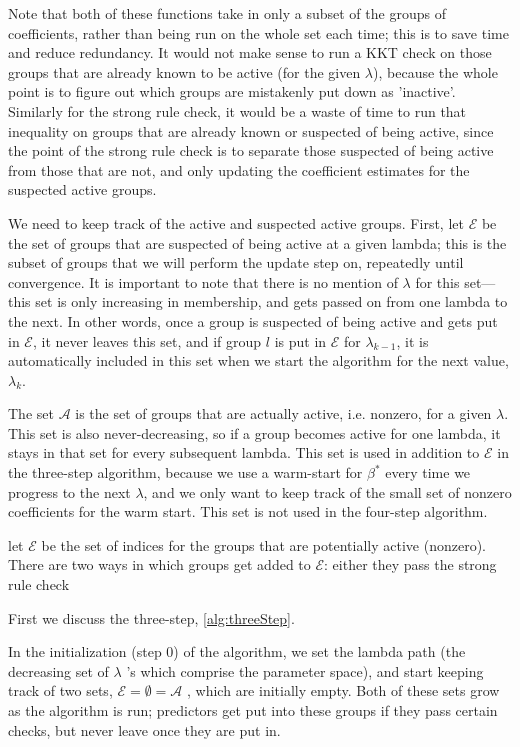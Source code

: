 \documentclass[titlepage]{article}
\begin{document}
Note that both of these functions take in only a subset of the groups of coefficients, rather than being run on the whole set each time; this is to save time and reduce redundancy. It would not make sense to run a KKT check on those groups that are already known to be active (for the given $\lambda$), because the whole point is to figure out which groups are mistakenly put down as 'inactive'. Similarly for the strong rule check, it would be a waste of time to run that inequality on groups that are already known or suspected of being active, since the point of the strong rule check is to separate those suspected of being active from those that are not, and only updating the coefficient estimates for the suspected active groups.

We need to keep track of the active and suspected active groups. First, let $\mathcal{E}$ be the set of groups that are suspected of being active at a given lambda; this is the subset of groups that we will perform the update step on, repeatedly until convergence. It is important to note that there is no mention of $\lambda$ for this set---this set is only increasing in membership, and gets passed on from one lambda to the next. In other words, once a group is suspected of being active and gets put in $\mathcal{E}$, it never leaves this set, and if group $l$ is put in $\mathcal{E}$ for $\lambda_{k-1}$, it is automatically included in this set when we start the algorithm for the next value, $\lambda_k$. 

The set $\mathcal{A}$ is the set of groups that are actually active, i.e. nonzero, for a given $\lambda$. This set is also never-decreasing, so if a group becomes active for one lambda, it stays in that set for every subsequent lambda. This set is used in addition to $\mathcal{E}$ in the three-step algorithm, because we use a warm-start for $\beta^*$ every time we progress to the next $\lambda$, and we only want to keep track of the small set of nonzero coefficients for the warm start. This set is not used in the four-step algorithm.

let $\mathcal{E}$ be the set of indices for the groups that are potentially active (nonzero). There are two ways in which groups get added to $\mathcal{E}$: either they pass the strong rule check


First we discuss the three-step, \autoref{alg:threeStep}.

In the initialization (step 0) of the algorithm, we set the lambda path (the decreasing set of $\lambda$ 's which comprise the parameter space), and start keeping track of two sets, $\mathcal{E} = \emptyset = \mathcal{A}$ , which are initially empty. Both of these sets grow as the algorithm is run; predictors get put into these groups if they pass certain checks, but never leave once they are put in.
\end{document}
